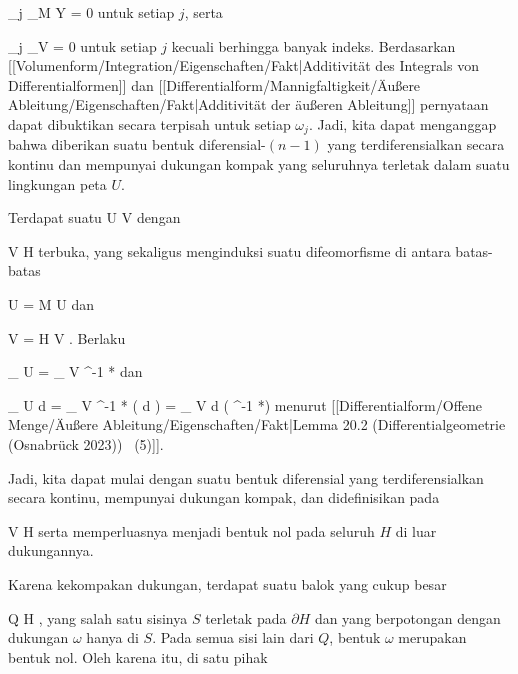 {{\mavergleichskette
{\vergleichskette
{ \omega_j \vert_{M \setminus Y}
}
{ = }{ 0
}
{ }{
}
{ }{
}
{ }{
}
}
{}{}{}
untuk setiap $j$, serta

\mavergleichskettedisp
{\vergleichskette
{ \omega_j \vert_V
}
{ =} { 0
}
{ } {
}
{ } {
}
{ } {
}
}
{}{}{}
untuk setiap $j$ kecuali berhingga banyak indeks. Berdasarkan
[[Volumenform/Integration/Eigenschaften/Fakt|Additivität des Integrals von Differentialformen]]
dan
[[Differentialform/Mannigfaltigkeit/Äußere Ableitung/Eigenschaften/Fakt|Additivität der äußeren Ableitung]]
pernyataan dapat dibuktikan secara terpisah untuk setiap $\omega_j$. Jadi, kita dapat menganggap bahwa diberikan suatu bentuk diferensial-$(n-1)$ yang terdiferensialkan secara kontinu dan mempunyai dukungan kompak yang seluruhnya terletak dalam suatu lingkungan peta $U$.}
{}
\teilbeweis {}{}{}
{Terdapat suatu
\maabb {\alpha} { U } { V
} {}
dengan

\mavergleichskette
{\vergleichskette
{ V
}
{ \subseteq }{ H
}
{ }{
}
{ }{
}
{ }{
}
}
{}{}{}
terbuka, yang sekaligus menginduksi suatu difeomorfisme di antara batas-batas

\mavergleichskette
{\vergleichskette
{ \partial U
}
{ = }{ \partial M \cap U
}
{  }{
}
{    }{
}
{   }{
}
}
{}{}{}
dan

\mavergleichskette
{\vergleichskette
{ \partial V
}
{ = }{ \partial H \cap V
}
{  }{
}
{    }{
}
{   }{
}
}
{}{}{}
. Berlaku

\mavergleichskettedisp
{\vergleichskette
{
\int_{ \partial U } \omega
}
{ = } {
\int_{ \partial V } \alpha^{-1 *}\omega
}
{ } {
}
{ } {
}
{ } {
}
}
{}{}{}
dan

\mavergleichskettedisp
{\vergleichskette
{
\int_{ U  }  d \omega
}
{ =} {
\int_{ V  }  \alpha^{-1 *} (  d \omega)
}
{ =} {
\int_{  V  }  d \left(  \alpha^{-1 *}\omega  \right)
}
{ } {
}
{ } {
}
}
{}{}{}
menurut
[[Differentialform/Offene Menge/Äußere Ableitung/Eigenschaften/Fakt|Lemma 20.2 (Differentialgeometrie (Osnabrück 2023))  (5)]].}
{\leerzeichen{}Jadi, kita dapat mulai dengan suatu bentuk diferensial yang terdiferensialkan secara kontinu, mempunyai dukungan kompak, dan didefinisikan pada

\mavergleichskette
{\vergleichskette
{ V
}
{ \subseteq }{ H
}
{ }{
}
{ }{
}
{ }{
}
}
{}{}{}
serta memperluasnya menjadi bentuk nol pada seluruh $H$ di luar dukungannya.}
\teilbeweis {}{}{}
{Karena kekompakan dukungan, terdapat suatu balok yang cukup besar

\mavergleichskette
{\vergleichskette
{ Q
}
{ \subseteq }{ H
}
{ }{
}
{ }{
}
{ }{
}
}
{}{}{,}
yang salah satu sisinya $S$ terletak pada $\partial H$ dan yang berpotongan dengan dukungan $\omega$ hanya di $S$. Pada semua sisi lain dari $Q$, bentuk $\omega$
 {} {}
merupakan bentuk nol. Oleh karena itu, di satu pihak

}}
